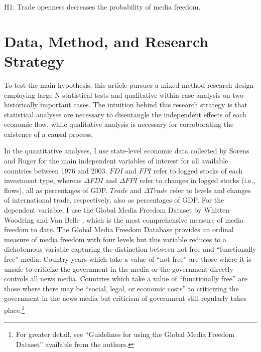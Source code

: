 \documentclass[12pt,a4paper]{article}\usepackage[]{graphicx}\usepackage[]{color}
\begin{document}
H1: Trade openness decreases the probability of media freedom.


\section{Data, Method, and Research Strategy}

To test the main hypothesis, this article pursues a mixed-method research design employing large-N statistical tests and qualitative within-case analysis on two historically important cases. The intuition behind this research strategy is that statistical analyses are necessary to disentangle the independent effects of each economic flow, while qualitative analysis is necessary for corroborating the existence of a causal process.

In the quantitative analyses, I use state-level economic data collected by Sorens and Ruger \parencite*{Sorens:wc} for the main independent variables of interest for all available countries between 1976 and 2003. $FDI$ and $FPI$ refer to logged stocks of each investment type, whereas $\Delta FDI$ and $\Delta FPI$ refer to changes in logged stocks (i.e., flows), all as percentages of GDP. $Trade$ and $\Delta Trade$ refer to levels and changes of international trade, respectively, also as percentages of GDP.   For the dependent variable, I use the Global Media Freedom Dataset by Whitten-Woodring and Van Belle \parencites*{van2000press}{Belle:1997wo}, which is the most comprehensive measure of media freedom to date. The Global Media Freedom Database provides an ordinal measure of media freedom with four levels but this variable reduces to a dichotomous variable capturing the distinction between not free and ``functionally free'' media. Country-years which take a value of ``not free'' are those where it is unsafe to criticize the government in the media or the government directly controls all news media. Countries which take a value of ``functionally free'' are those where there may be ``social, legal, or economic costs'' to criticizing the government in the news media but criticism of government still regularly takes place.\footnote{For greater detail, see ``Guidelines for using the Global Media Freedom Dataset'' available from the authors.}
\end{document}
